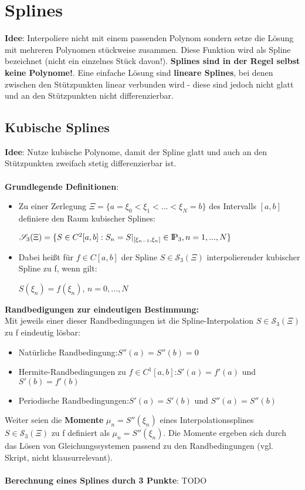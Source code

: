 \documentclass[10pt,a4paper]{article}
\def\polynomials{{\rm I\!P}}
\begin{document}
	\section{Splines}
	\textbf{Idee}: Interpoliere nicht mit einem passenden Polynom sondern setze die Lösung mit mehreren Polynomen stückweise zusammen. Diese Funktion wird als Spline bezeichnet (nicht ein einzelnes Stück davon!). \textbf{Splines sind in der Regel selbst keine Polynome!}. Eine einfache Lösung sind \textbf{lineare Splines}, bei denen zwischen den Stützpunkten linear verbunden wird - diese sind jedoch nicht glatt und an den Stützpunkten nicht differenzierbar.
	
	\subsection{Kubische Splines}
	\textbf{Idee}: Nutze kubische Polynome, damit der Spline glatt und auch an den Stützpunkten zweifach stetig differenzierbar ist.\\\\
	\textbf{Grundlegende Definitionen}:\\
	\begin{itemize}
		\item Zu einer Zerlegung $\Xi = \{a = \xi_0 < \xi_1 < ... < \xi_N = b\}$ des Intervalls $[a, b]$ definiere den Raum kubischer Splines:
		\begin{center}
			$\mathscr{S}_3(\Xi) = \{S \in C^2[a, b]: S_n = S|_{[\xi_{n-1}, \xi_n]} \in \polynomials_3, n = 1, ..., N\}$
		\end{center}
		\item Dabei heißt für $f \in C[a, b]$ der Spline $S \in \mathscr{S}_3(\Xi)$ interpolierender kubischer Spline zu f, wenn gilt:
		\begin{center}
			$S(\xi_n) = f(\xi_n)$, $n = 0, ..., N$
		\end{center}
	\end{itemize}
	\textbf{Randbedigungen zur eindeutigen Bestimmung:}\\
	Mit jeweils einer dieser Randbedingungen ist die Spline-Interpolation $S \in \mathscr{S}_3(\Xi)$ zu f eindeutig lösbar:
	\begin{itemize}
		\item Natürliche Randbedingung:\hfill$S''(a) = S''(b) = 0$
		\item Hermite-Randbedingungen zu $f \in C^1[a, b]$:\hfill$S'(a) = f'(a)$ und $S'(b) = f'(b)$
		\item Periodische Randbedingungen:\hfill$S'(a) = S'(b)$ und $S''(a) = S''(b)$
	\end{itemize}
	Weiter seien die \textbf{Momente} $\mu_n = S''(\xi_n)$ eines Interpolationssplines $S \in \mathscr{S}_3(\Xi)$ zu f definiert als $\mu_n = S''(\xi_n)$. Die Momente ergeben sich durch das Lösen von Gleichungssystemen passend zu den Randbedingungen (vgl. Skript, nicht klausurrelevant).\\\\
	\textbf{Berechnung eines Splines durch 3 Punkte}: TODO\\
	
\end{document}
